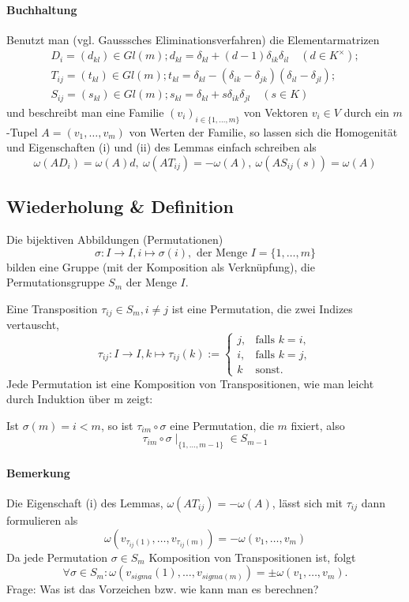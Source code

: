 \paragraph{Buchhaltung}
	Benutzt man (vgl. Gausssches Eliminationsverfahren) die Elementarmatrizen
	\begin{gather*}
		D_i = (d_{kl}) \in Gl(m); d_{kl} = \delta_{kl}+(d-1)\delta_{ik}\delta_{il}\quad (d\in K^\times);\\
		T_{ij} = (t_{kl}) \in Gl(m); t_{kl} = \delta_{kl}-(\delta_{ik}-\delta_{jk})(\delta_{il}-\delta_{jl});\\
		S_{ij} = (s_{kl})\in Gl(m); s_{kl}=\delta_{kl}+s\delta_{ik}\delta_{jl}\quad (s\in K)
	\end{gather*}
	und beschreibt man eine Familie $ (v_i)_{i\in \{1,\dots,m\}} $ von Vektoren $ v_i\in V $ durch ein $ m $-Tupel $ A=(v_1,\dots,v_m) $ von Werten der Familie, so lassen sich die Homogenität und Eigenschaften (i) und (ii) des Lemmas einfach schreiben als
		\[ \omega(AD_i) = \omega(A)d,\ \omega(AT_{ij}) = -\omega(A),\ \omega(AS_{ij}(s)) = \omega(A) \]
\subsection{Wiederholung \& Definition}
	Die bijektiven Abbildungen (Permutationen)
		\[ \sigma: I\to I, i\mapsto \sigma(i),\text{ der Menge }I = \{1,\dots,m\} \]
	bilden eine Gruppe (mit der Komposition als Verknüpfung), die Permutationsgruppe $ S_m $ der Menge $ I $.
	\begin{Definition}[Transposition]
	Eine Transposition $ \tau_{ij} \in S_m, i\neq j $ ist eine Permutation, die zwei Indizes vertauscht,
		\[ \tau_{ij}:I\to I, k\mapsto \tau_{ij}(k):=
		\begin{cases}
			j, &\text{falls } k=i,\\
			i, &\text{falls } k=j,\\
			k & \text{sonst}.
		\end{cases} \]
	Jede Permutation ist eine Komposition von Transpositionen, wie man leicht durch Induktion über m zeigt:
	
	Ist $ \sigma(m) = i<m$, so ist $ \tau_{im}\circ \sigma $ eine Permutation, die $ m $ fixiert, also
		\[ \tau_{im}\circ\sigma\mid_{\{1,\dots,m-1\}}\in S_{m-1} \]
	\end{Definition}
\paragraph{Bemerkung}
	Die Eigenschaft (i) des Lemmas, $ \omega(AT_{ij})=-\omega(A) $, lässt sich mit $ \tau_{ij} $ dann formulieren als
		\[ \omega(v_{\tau_{ij}(1)}, \dots, v_{\tau_{ij}(m)}) = - \omega(v_1,\dots,v_m) \]
	Da jede Permutation $ \sigma\in S_m $ Komposition von Transpositionen ist, folgt
		\[ \forall \sigma\in S_m: \omega(v_{sigma}(1),\dots,v_{sigma(m)})=\pm \omega(v_1,\dots,v_{m}). \]
	Frage: Was ist das Vorzeichen bzw. wie kann man es berechnen?
